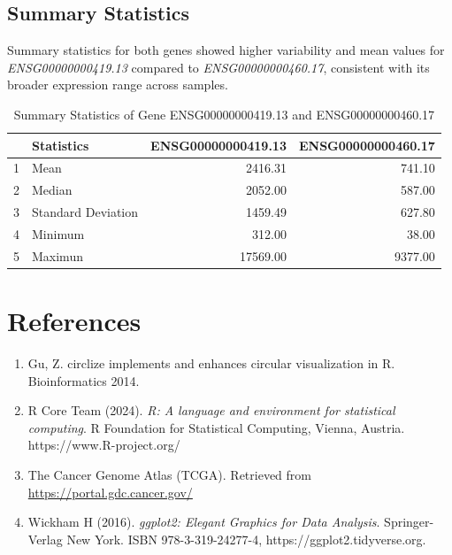 \documentclass{article}
\begin{document}
\subsection{Summary Statistics}
Summary statistics for both genes showed higher variability and mean values for \textit{ENSG00000000419.13} compared to \textit{ENSG00000000460.17}, consistent with its broader expression range across samples.



\begin{table}[ht]
\centering
\begin{tabular}{ |c|l|r|r| }
  \hline
 & Statistics & ENSG00000000419.13 & ENSG00000000460.17 \\ 
  \hline
1 & Mean & 2416.31 & 741.10 \\ \hline
  2 & Median & 2052.00 & 587.00 \\ \hline
  3 & Standard Deviation & 1459.49 & 627.80 \\ \hline
  4 & Minimum & 312.00 & 38.00 \\ \hline
  5 & Maximun & 17569.00 & 9377.00 \\ \hline
\end{tabular}
\caption{Summary Statistics of Gene ENSG00000000419.13 and ENSG00000000460.17} 
\end{table}



\section{References}
\begin{enumerate}
    \item Gu, Z. circlize implements and enhances circular visualization in R. Bioinformatics 2014.  
    \item R Core Team (2024). \textit{R: A language and environment for statistical computing}. R Foundation for Statistical Computing, Vienna, Austria. https://www.R-project.org/ 
    \item The Cancer Genome Atlas (TCGA). Retrieved from \url{https://portal.gdc.cancer.gov/}
    \item Wickham H (2016). \textit{ggplot2: Elegant Graphics for Data Analysis}. Springer-Verlag New York. ISBN 978-3-319-24277-4, https://ggplot2.tidyverse.org. 
\end{enumerate}
\end{document}
